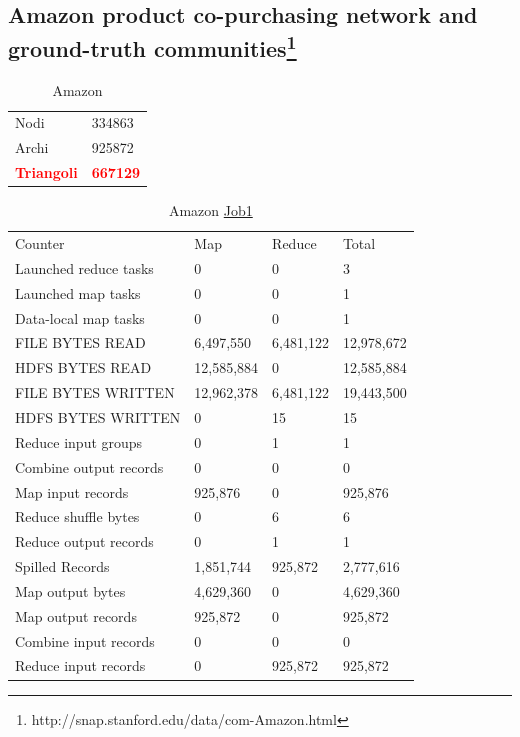 \documentclass[paper=a4, fontsize=11pt]{scrartcl}	%
\numberwithin{equation}{section}															%
\numberwithin{figure}{section}																%
\numberwithin{table}{section}																%
\begin{document}
\subsection{Amazon product co-purchasing network and ground-truth communities\protect\footnote{http://snap.stanford.edu/data/com-Amazon.html}} 
\protect\begin{table}[!h]
	\centering
	\caption{Amazon}
	\label{my-label}
	\begin{tabular}{ll}
		Nodi		 & 334863 \\
		Archi		 & 925872 \\
		\textbf{\textcolor{red}{Triangoli}}	& \textbf{\textcolor{red}{667129}} \\
	\end{tabular}
\end{table}
\begin{table}[!h]
	\centering
	\caption{Amazon \href{http://hadoop-compute0.di.univr.it:50030/jobdetails.jsp?jobid=job_201603141010_12296}{Job1}\\}
	\label{my-label}
	\begin{tabular}{llll}
		Counter&	Map&	Reduce&	Total\\
		Launched reduce tasks&	0&	0&	3\\
		Launched map tasks&	0&	0&	1\\
		Data-local map tasks&	0&	0&	1\\
		FILE BYTES READ&	6,497,550&	6,481,122&	12,978,672\\
		HDFS BYTES READ&	12,585,884&	0&	12,585,884\\
		FILE BYTES WRITTEN&	12,962,378&	6,481,122&	19,443,500\\
		HDFS BYTES WRITTEN&	0&	15&	15\\
		Reduce input groups&	0&	1&	1\\
		Combine output records&	0&	0&	0\\
		Map input records&	925,876&	0&	925,876\\
		Reduce shuffle bytes&	0&	6&	6\\
		Reduce output records&	0&	1&	1\\
		Spilled Records&	1,851,744&	925,872&	2,777,616\\
		Map output bytes&	4,629,360&	0&	4,629,360\\
		Map output records&	925,872&	0&	925,872\\
		Combine input records&	0&	0&	0\\
		Reduce input records&	0&	925,872&	925,872\\
		
	\end{tabular}
\end{table}
\end{document}
